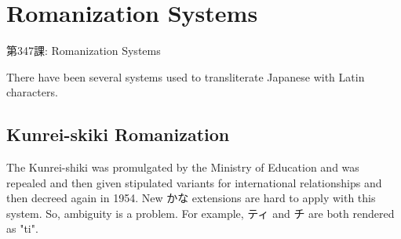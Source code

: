     
\chapter{Romanization Systems}

\begin{center}
\begin{Large}
第347課: Romanization Systems 
\end{Large}
\end{center}
 
\par{ There have been several systems used to transliterate Japanese with Latin characters. }
      
\section{Kunrei-skiki Romanization}
 
\par{  The Kunrei-shiki was promulgated by the Ministry of Education and was repealed and then given stipulated variants for international relationships and then decreed again in 1954. New かな extensions are hard to apply with this system. So, ambiguity is a problem. For example, ティ and チ are both rendered as "ti". }

